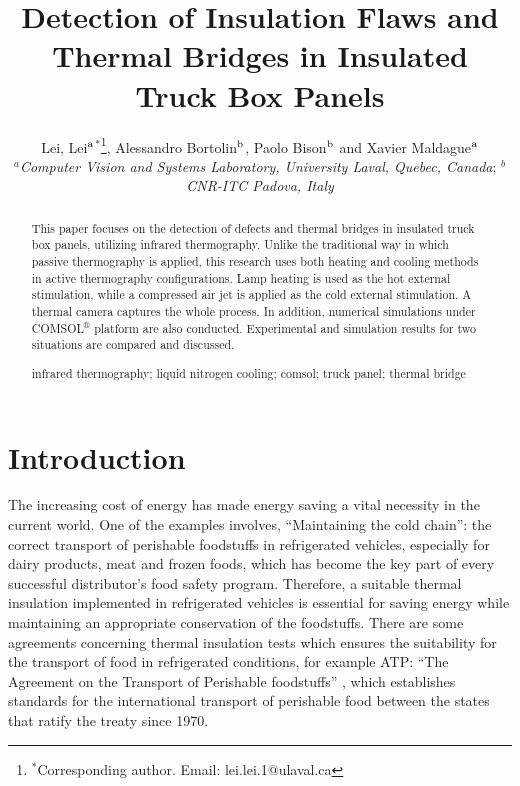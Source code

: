 \documentclass{tQRT2e}
\begin{document}


\title{Detection of Insulation Flaws and Thermal Bridges in Insulated Truck Box Panels}

\author{Lei, Lei$^{\rm a}$$^{\ast}$\thanks{$^\ast$Corresponding author. Email: lei.lei.1@ulaval.ca
\vspace{6pt}},  Alessandro Bortolin$^{\rm b}$, Paolo Bison$^{\rm b}$ and Xavier Maldague$^{\rm a}$\\\vspace{6pt}  $^{a}${\em{Computer Vision and Systems Laboratory, University Laval, Quebec, Canada}};
$^{b}${\em{CNR-ITC Padova, Italy}} \\\received{}}

\maketitle

\begin{abstract}
This paper focuses on the detection of defects and thermal bridges in insulated truck box panels, utilizing infrared thermography. Unlike the traditional way in which passive thermography is applied, this research uses both heating and cooling methods in active thermography configurations. Lamp heating is used as the hot external stimulation, while a compressed air jet is applied as the cold external stimulation. A thermal camera captures the whole process. In addition, numerical simulations under COMSOL$^®$ platform are also conducted. Experimental and simulation results for two situations are compared and discussed.

\begin{keywords}infrared thermography; liquid nitrogen cooling; comsol; truck panel; thermal bridge
\end{keywords}

\end{abstract}


\section{Introduction}

The increasing cost of energy has made energy saving a vital necessity in the current world. One of the examples involves, “Maintaining the cold chain”: the correct transport of perishable foodstuffs in refrigerated vehicles, especially for dairy products, meat and frozen foods, which has become the key part of every successful distributor’s food safety program. Therefore, a suitable thermal insulation implemented in refrigerated vehicles is essential for saving energy while maintaining an appropriate conservation of the foodstuffs. There are some agreements concerning thermal insulation tests which ensures the suitability for the transport of food in refrigerated conditions, for example ATP: “The Agreement on the Transport of Perishable foodstuffs” \cite{Geneva1970}, which establishes standards for the international transport of perishable food between the states that ratify the treaty since 1970.
\end{document}
